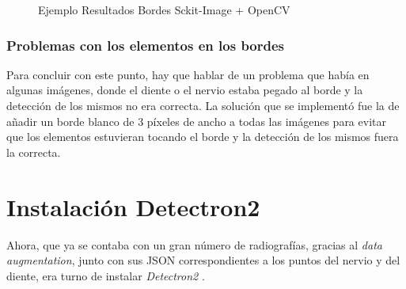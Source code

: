 \begin{figure}[h]
 \centering
 \caption{Ejemplo Resultados Bordes Sckit-Image + OpenCV}
 \label{f:sskimage+cv2}
\end{figure}

\subsubsection{Problemas con los elementos en los bordes}
Para concluir con este punto, hay que hablar de un problema que había en algunas imágenes, donde el diente o el nervio estaba pegado al borde y la detección de los mismos no era correcta. La solución que se implementó fue la de añadir un borde blanco de 3 píxeles de ancho a todas las imágenes para evitar que los elementos estuvieran tocando el borde y la detección de los mismos fuera la correcta.

\section{Instalación Detectron2}
Ahora, que ya se contaba con un gran número de radiografías, gracias al \emph{data augmentation}, junto con sus JSON correspondientes a los puntos del nervio y del diente, era turno de instalar \emph{Detectron2} \cite{wu2019detectron2}.

